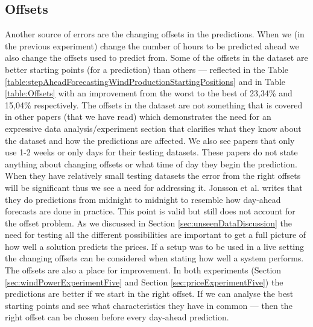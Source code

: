 \subsection{Offsets}
\label{sec:offsetsDiscussion}
Another source of errors are the changing offsets in the predictions. When we (in the previous experiment) change the number of hours to be predicted ahead we also change the offsets used to predict from. Some of the offsets in the dataset are better starting points (for a prediction) than others --- reflected in the Table \ref{table:stepAheadForecastingWindProductionStartingPositions} and in Table \ref{table:Offsets} with an improvement from the worst to the best of 23,34\% and 15,04\% respectively. The offsets in the dataset are not something that is covered in other papers (that we have read) which demonstrates the need for an expressive data analysis/experiment section that clarifies what they know about the dataset and how the predictions are affected. We also see papers that only use 1-2 weeks\cite{yamin2004adaptive} or only days \cite{1, singhal2011electricity, pjmForecast} for their testing datasets. These papers do not state anything about changing offsets or what time of day they begin the prediction. When they have relatively small testing datasets the error from the right offsets will be significant thus we see a need for addressing it. Jonsson et al.\cite{forecastingSpotPricesAccountingForWindPower} writes that they do predictions from midnight to midnight to resemble how day-ahead forecasts are done in practice. This point is valid but still does not account for the offset problem. As we discussed in Section \ref{sec:unseenDataDiscussion} the need for testing all the different possibilities are important to get a full picture of how well a solution predicts the prices. If a setup was to be used in a live setting the changing offsets can be considered when stating how well a system performs. The offsets are also a place for improvement. In both experiments (Section \ref{sec:windPowerExperimentFive} and Section \ref{sec:priceExperimentFive}) the predictions are better if we start in the right offset. If we can analyse the best starting points and see what characteristics they have in common --- then the right offset can be chosen before every day-ahead prediction.